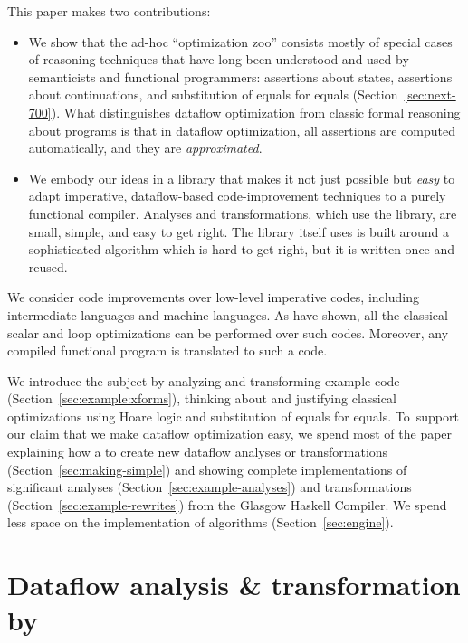 \documentclass[blockstyle,preprint,nocopyrightspace]{sigplanconf}
\newcommand\secref[1]{Section~\ref{sec:#1}}
\begin{document}
This paper makes two contributions:
\begin{itemize}
\item
We show that the ad-hoc ``optimization zoo'' consists mostly of special
cases of reasoning techniques that have long been understood and used
by semanticists and functional programmers:
assertions about states, assertions about continuations, and
substitution of equals for equals (\secref{next-700}).
What distinguishes dataflow optimization from classic formal reasoning
about programs is that in dataflow optimization, all assertions are
computed automatically, and they are
\emph{approximated}. 
\item
We embody our ideas in a library that makes it not just
possible but \emph{easy} to adapt imperative, dataflow-based
code-improvement techniques to a purely functional compiler.
Analyses and transformations, which use the library,
are small, simple, and easy to get right.
The library itself
\ifpagetuning uses \else is built around \fi
 a sophisticated algorithm which is
hard to get right, but it is 
written once and reused.
\end{itemize}

We consider code improvements over low-level
imperative codes, including intermediate languages and machine
languages.
As \citet{benitez-davidson:portable-optimizer} have shown, all the
classical scalar and loop optimizations can be performed over such
codes.
Moreover, any compiled functional program is
translated to such a code.


We introduce the subject by analyzing and transforming example code 
(\secref{example:xforms}),
thinking about and justifying classical optimizations using
Hoare logic and substitution of equals for equals.
To~support our claim that we make dataflow optimization easy, 
we spend most of the paper explaining how
a to create new dataflow analyses or transformations
(\secref{making-simple}) and showing complete implementations of significant
analyses (\secref{example-analyses}) and transformations
(\secref{example-rewrites}) from the Glasgow Haskell Compiler.
We spend less space on the implementation of algorithms (\secref{engine}).


\section{Dataflow analysis {\&} transformation by }
\end{document}
